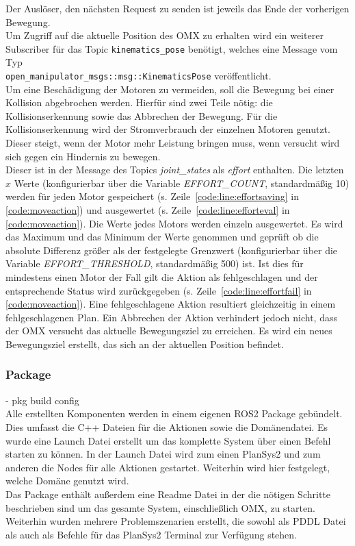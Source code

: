 Der Auslöser, den nächsten Request zu senden ist jeweils das Ende der vorherigen Bewegung.\\
Um Zugriff auf die aktuelle Position des OMX zu erhalten wird ein weiterer Subscriber für das Topic \verb|kinematics_pose| benötigt, welches eine Message vom Typ\\
\verb|open_manipulator_msgs::msg::KinematicsPose| veröffentlicht.\\
Um eine Beschädigung der Motoren zu vermeiden, soll die Bewegung bei einer Kollision abgebrochen werden.
Hierfür sind zwei Teile nötig: die Kollisionserkennung sowie das Abbrechen der Bewegung.
Für die Kollisionserkennung wird der Stromverbrauch der einzelnen Motoren genutzt.
Dieser steigt, wenn der Motor mehr Leistung bringen muss, wenn versucht wird sich gegen ein Hindernis zu bewegen.\\
Dieser ist in der Message des Topics \emph{joint\_states} als \emph{effort} enthalten.
Die letzten $x$ Werte (konfigurierbar über die Variable \emph{EFFORT\_COUNT}, standardmäßig 10) werden für jeden Motor gespeichert (s. Zeile~\ref{code:line:effortsaving} in \ref{code:moveaction}) und ausgewertet (s. Zeile~\ref{code:line:efforteval} in \ref{code:moveaction}).
Die Werte jedes Motors werden einzeln ausgewertet.
Es wird das Maximum und das Minimum der Werte genommen und geprüft ob die absolute Differenz größer als der festgelegte Grenzwert (konfigurierbar über die Variable \emph{EFFORT\_THRESHOLD}, standardmäßig 500) ist.
Ist dies für mindestens einen Motor der Fall gilt die Aktion als fehlgeschlagen und der entsprechende Status wird zurückgegeben (s. Zeile~\ref{code:line:effortfail} in \ref{code:moveaction}).
Eine fehlgeschlagene Aktion resultiert gleichzeitig in einem fehlgeschlagenen Plan.
Ein Abbrechen der Aktion verhindert jedoch nicht, dass der OMX versucht das aktuelle Bewegungsziel zu erreichen.
Es wird ein neues Bewegungsziel erstellt, das sich an der aktuellen Position befindet.


\subsubsection{Package}
- pkg build config\\
Alle erstellten Komponenten werden in einem eigenen \ac{ROS2} Package gebündelt.
Dies umfasst die C++ Dateien für die Aktionen sowie die Domänendatei.
Es wurde eine Launch Datei erstellt um das komplette System über einen Befehl starten zu können.
In der Launch Datei wird zum einen \ac{PlanSys2} und zum anderen die Nodes für alle Aktionen gestartet.
Weiterhin wird hier festgelegt, welche Domäne genutzt wird.\\
Das Package enthält außerdem eine Readme Datei in der die nötigen Schritte beschrieben sind um das gesamte System, einschließlich OMX, zu starten.
Weiterhin wurden mehrere Problemszenarien erstellt, die sowohl als \ac{PDDL} Datei als auch als Befehle für das \ac{PlanSys2} Terminal zur Verfügung stehen.

